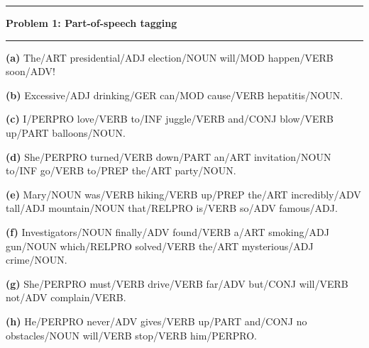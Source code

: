 \documentclass[11pt]{article}
\newcommand\question[2]{\vspace{.25in}\hrule\textbf{#1: #2}\vspace{.5em}\hrule\vspace{.10in}}
\renewcommand\part[1]{\vspace{.10in}\textbf{(#1)}}
\begin{document}
\raggedright

\newcommand\NAME{Jake Pitkin}
\newcommand\UID{u0891770}
\newcommand\HWNUM{1}

\question{Problem 1}{Part-of-speech tagging}

\part{a} The/ART presidential/ADJ election/NOUN will/MOD happen/VERB soon/ADV!

\part{b} Excessive/ADJ drinking/GER can/MOD cause/VERB hepatitis/NOUN.

\part{c} I/PERPRO love/VERB to/INF juggle/VERB and/CONJ blow/VERB up/PART balloons/NOUN.

\part{d} She/PERPRO turned/VERB down/PART an/ART invitation/NOUN to/INF go/VERB to/PREP the/ART party/NOUN.

\part{e} Mary/NOUN was/VERB hiking/VERB up/PREP the/ART incredibly/ADV tall/ADJ mountain/NOUN that/RELPRO is/VERB so/ADV famous/ADJ.

\part{f} Investigators/NOUN finally/ADV found/VERB a/ART smoking/ADJ gun/NOUN which/RELPRO solved/VERB the/ART mysterious/ADJ crime/NOUN.

\part{g} She/PERPRO must/VERB drive/VERB far/ADV but/CONJ will/VERB not/ADV complain/VERB.

\part{h} He/PERPRO never/ADV gives/VERB up/PART and/CONJ no obstacles/NOUN will/VERB stop/VERB him/PERPRO.
\end{document}
